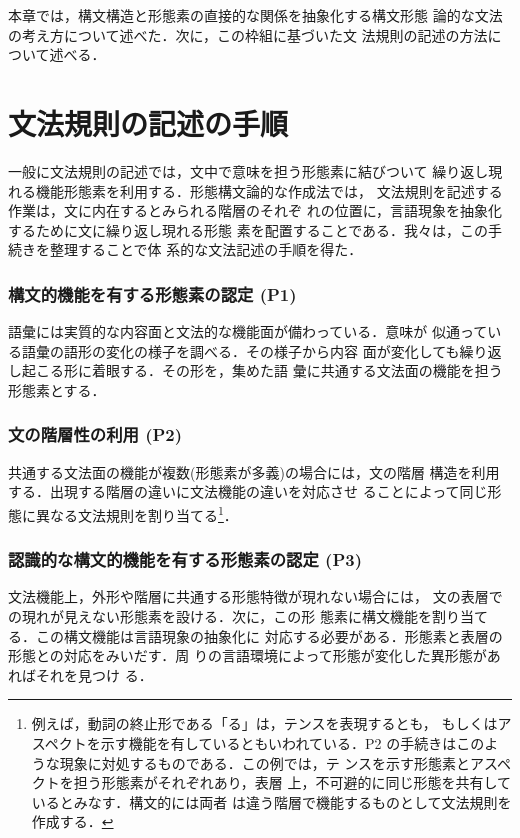 本章では，構文構造と形態素の直接的な関係を抽象化する構文形態
論的な文法の考え方について述べた．次に，この枠組に基づいた文
法規則の記述の方法について述べる．

\section{文法規則の記述の手順}
\label{文法規則の記述の手順}


一般に文法規則の記述では，文中で意味を担う形態素に結びついて
繰り返し現れる機能形態素を利用する．形態構文論的な作成法では，
文法規則を記述する作業は，文に内在するとみられる階層のそれぞ
れの位置に，言語現象を抽象化するために文に繰り返し現れる形態
素を配置することである．我々は，この手続きを整理することで体
系的な文法記述の手順を得た．

\subsubsection*{構文的機能を有する形態素の認定 (P1)}

語彙には実質的な内容面と文法的な機能面が備わっている．意味が
似通っている語彙の語形の変化の様子を調べる．その様子から内容
面が変化しても繰り返し起こる形に着眼する．その形を，集めた語
彙に共通する文法面の機能を担う形態素とする．

\subsubsection*{文の階層性の利用 (P2)}

共通する文法面の機能が複数(形態素が多義)の場合には，文の階層
構造を利用する．出現する階層の違いに文法機能の違いを対応させ
ることによって同じ形態に異なる文法規則を割り当てる\footnote
{例えば，動詞の終止形である「る」は，テンスを表現するとも，
もしくはアスペクトを示す機能を有しているともいわれている．P2 
の手続きはこのような現象に対処するものである．この例では，テ
ンスを示す形態素とアスペクトを担う形態素がそれぞれあり，表層
上，不可避的に同じ形態を共有しているとみなす．構文的には両者
は違う階層で機能するものとして文法規則を作成する．}．

\subsubsection*{認識的な構文的機能を有する形態素の認定 (P3)}

文法機能上，外形や階層に共通する形態特徴が現れない場合には，
文の表層での現れが{\dg 見えない}形態素を設ける．次に，この形
態素に構文機能を割り当てる．この構文機能は言語現象の抽象化に
対応する必要がある．形態素と表層の形態との対応をみいだす．周
りの言語環境によって形態が変化した異形態があればそれを見つけ
る．

